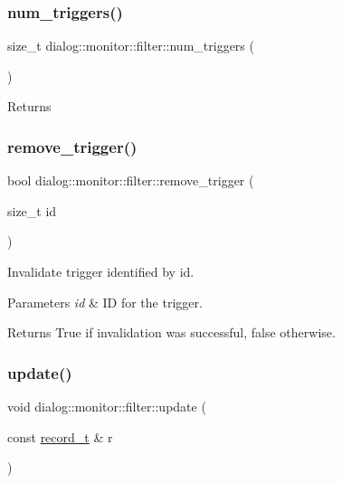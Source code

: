 \subsubsection{\texorpdfstring{num\+\_\+triggers()}{num\_triggers()}}
{\footnotesize\ttfamily size\+\_\+t dialog\+::monitor\+::filter\+::num\+\_\+triggers (\begin{DoxyParamCaption}{ }\end{DoxyParamCaption})\hspace{0.3cm}{\ttfamily [inline]}}

\begin{DoxyReturn}{Returns}

\end{DoxyReturn}
\mbox{\label{classdialog_1_1monitor_1_1filter_ac5c01fdc260a434815ab2bbd66ae9ab5}} 
\subsubsection{\texorpdfstring{remove\+\_\+trigger()}{remove\_trigger()}}
{\footnotesize\ttfamily bool dialog\+::monitor\+::filter\+::remove\+\_\+trigger (\begin{DoxyParamCaption}\item[{size\+\_\+t}]{id }\end{DoxyParamCaption})\hspace{0.3cm}{\ttfamily [inline]}}

Invalidate trigger identified by id.


\begin{DoxyParams}{Parameters}
{\em id} & ID for the trigger. \\
\hline
\end{DoxyParams}
\begin{DoxyReturn}{Returns}
True if invalidation was successful, false otherwise. 
\end{DoxyReturn}
\mbox{\label{classdialog_1_1monitor_1_1filter_a9daf4fdb82ff01d211a417e1531461e2}} 
\subsubsection{\texorpdfstring{update()}{update()}\hspace{0.1cm}{\footnotesize\ttfamily [1/2]}}
{\footnotesize\ttfamily void dialog\+::monitor\+::filter\+::update (\begin{DoxyParamCaption}\item[{const \hyperlink{structdialog_1_1record__t}{record\+\_\+t} \&}]{r }\end{DoxyParamCaption})\hspace{0.3cm}{\ttfamily [inline]}}

